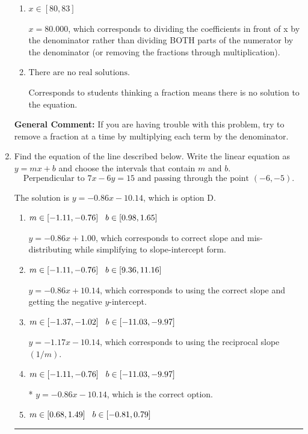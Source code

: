 \documentclass{extbook}[14pt]
\newcommand{\litem}[1]{\item #1

\rule{\textwidth}{0.4pt}}
\begin{document}
\begin{enumerate}
{\begin{enumerate}[label=\Alph*.]
 $x = 0.497$, which corresponds to dividing the second number in the numerator by the denominator rather than dividing BOTH parts of the numerator by the denominator (or removing the fractions through multiplication).
\item \( x \in [80, 83] \)

 $x = 80.000$, which corresponds to dividing the coefficients in front of x by the denominator rather than dividing BOTH parts of the numerator by the denominator (or removing the fractions through multiplication).
\item \( \text{There are no real solutions.} \)

Corresponds to students thinking a fraction means there is no solution to the equation.
\end{enumerate}

\textbf{General Comment:} If you are having trouble with this problem, try to remove a fraction at a time by multiplying each term by the denominator.
}
\litem{
Find the equation of the line described below. Write the linear equation as $ y=mx+b $ and choose the intervals that contain $m$ and $b$.
\[ \text{Perpendicular to } 7 x - 6 y = 15 \text{ and passing through the point } (-6, -5). \]

The solution is \( y = -0.86x - 10.14 \), which is option D.\begin{enumerate}[label=\Alph*.]
\item \( m \in [-1.11, -0.76] \hspace*{3mm} b \in [0.98, 1.65] \)

 $y = -0.86x + 1.00$, which corresponds to correct slope and mis-distributing while simplifying to slope-intercept form.
\item \( m \in [-1.11, -0.76] \hspace*{3mm} b \in [9.36, 11.16] \)

 $y = -0.86x + 10.14$, which corresponds to using the correct slope and getting the negative $y$-intercept.
\item \( m \in [-1.37, -1.02] \hspace*{3mm} b \in [-11.03, -9.97] \)

 $y = -1.17x - 10.14$, which corresponds to using the reciprocal slope $(1/m)$.
\item \( m \in [-1.11, -0.76] \hspace*{3mm} b \in [-11.03, -9.97] \)

* $y = -0.86x - 10.14$, which is the correct option.
\item \( m \in [0.68, 1.49] \hspace*{3mm} b \in [-0.81, 0.79] \)


\end{enumerate}}
\end{enumerate}
\end{document}
